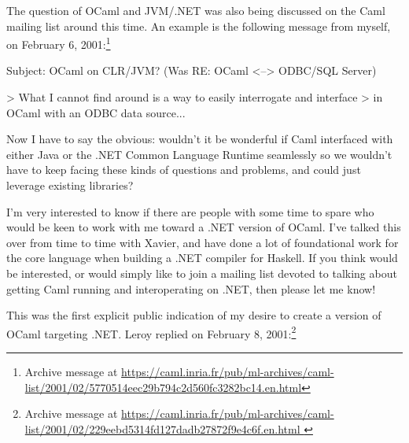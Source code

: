 \documentclass[acmsmall]{acmart}\settopmatter{}
\begin{document}
The question of OCaml and JVM/.NET was also being discussed on the Caml mailing list around this time.  An example is the following message from
myself, on February 6, 2001:\footnote{ Archive message at \url{https://caml.inria.fr/pub/ml-archives/caml-list/2001/02/5770514eec29b794c2d560fc3282bc14.en.html}}
\begin{verbquote}
Subject: OCaml on CLR/JVM? (Was RE: OCaml <--> ODBC/SQL Server)

> What I cannot find around is a way to easily interrogate and interface 
> in OCaml with an ODBC data source...

Now I have to say the obvious: wouldn't it be wonderful if Caml interfaced with either Java or the .NET Common Language Runtime seamlessly so we wouldn't have to keep facing these kinds of questions and problems, and could just leverage existing libraries?   

I'm very interested to know if there are people with some time to spare who would be keen to work with me toward a .NET version of OCaml.  I've talked this over from time to time with Xavier, and have done a lot of foundational work for the core language when building a .NET compiler for Haskell.  If you think would be interested, or would simply like to join a mailing list devoted to talking about getting Caml running and interoperating on .NET, then please let me know!
\end{verbquote}
This was the first explicit public indication of my desire to create a version of OCaml targeting .NET. Leroy replied on February 8, 2001:\footnote{ Archive message at \url{https://caml.inria.fr/pub/ml-archives/caml-list/2001/02/229eebd5314fd127dadb27872f9e4c6f.en.html }}
\end{document}
